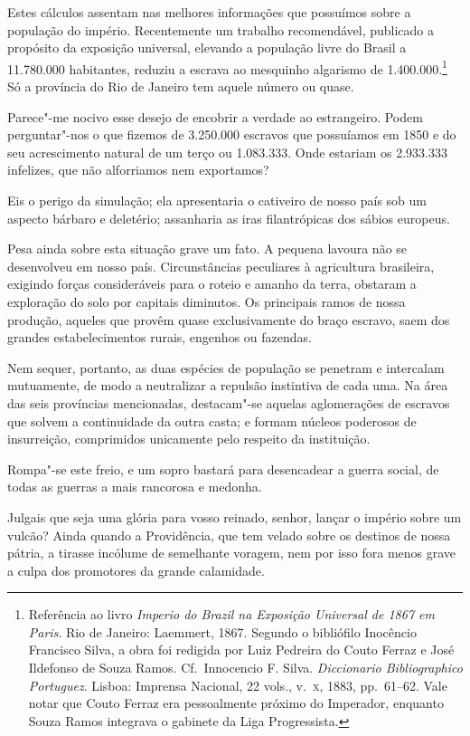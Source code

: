 Estes cálculos assentam nas melhores informações que possuímos sobre a
população do império. Recentemente um trabalho recomendável, publicado
a propósito da exposição universal, elevando a população livre do
Brasil a 11.780.000 habitantes, reduziu a escrava ao mesquinho
algarismo de 1.400.000.\footnote{ Referência ao livro \textit{Imperio do Brazil na Exposição Universal de
1867 em Paris}. Rio de Janeiro: Laemmert, 1867. Segundo o bibliófilo
Inocêncio Francisco Silva, a obra foi redigida por Luiz Pedreira do
Couto Ferraz e José Ildefonso de Souza Ramos. Cf.~Innocencio F. Silva.
\textit{Diccionario Bibliographico Portuguez}. Lisboa: Imprensa
Nacional, 22 vols., v.~\textsc{x}, 1883, pp.~61--62. Vale notar que Couto
Ferraz era pessoalmente próximo do Imperador, enquanto Souza Ramos
integrava o gabinete da Liga Progressista.}
 Só a província do Rio de Janeiro tem aquele número ou quase.

Parece"-me nocivo esse desejo de encobrir a verdade ao estrangeiro.
Podem perguntar"-nos o que fizemos de 3.250.000 escravos que
possuíamos em 1850 e do seu acrescimento natural de um terço ou
1.083.333. Onde estariam os 2.933.333 infelizes, que não alforriamos nem exportamos?

Eis o perigo da simulação; ela apresentaria o cativeiro de nosso país
sob um aspecto bárbaro e deletério; assanharia as iras filantrópicas
dos sábios europeus.

Pesa ainda sobre esta situação grave um fato. A pequena lavoura não se
desenvolveu em nosso país. Circunstâncias peculiares à agricultura
brasileira, exigindo forças consideráveis para o roteio e amanho da
terra, obstaram a exploração do solo por capitais diminutos. Os
principais ramos de nossa produção, aqueles que provêm quase
exclusivamente do braço escravo, saem dos grandes estabelecimentos
rurais, engenhos ou fazendas. 

Nem sequer, portanto, as duas espécies de população se penetram e
intercalam mutuamente, de modo a neutralizar a repulsão instintiva de
cada uma. Na área das seis províncias mencionadas, destacam"-se
aquelas aglomerações de escravos que solvem a continuidade da outra
casta; e formam núcleos poderosos de insurreição, comprimidos
unicamente pelo respeito da instituição.

Rompa"-se este freio, e um sopro bastará para desencadear a guerra
social, de todas as guerras a mais rancorosa e medonha.

Julgais que seja uma glória para vosso reinado, senhor, lançar o império
sobre um vulcão? Ainda quando a Providência, que tem velado sobre os
destinos de nossa pátria, a tirasse incólume de semelhante voragem, nem
por isso fora menos grave a culpa dos promotores da grande calamidade. 

